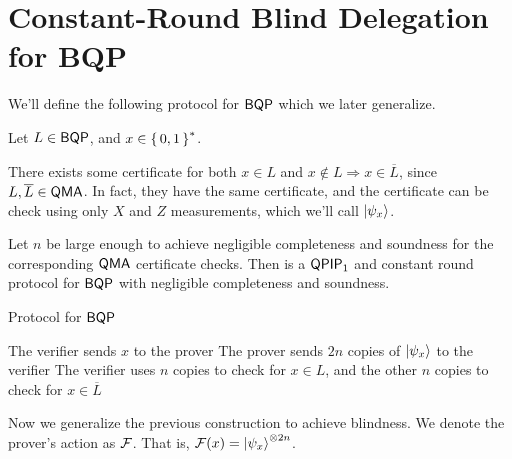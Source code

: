 \section{Constant-Round Blind Delegation for BQP}
\label{sec:BlindBQP}



We'll define the following protocol for $\operatorname{\mathsf{BQP}}$ which we later generalize.

Let $L\in\operatorname{\mathsf{BQP}}$, and $x\in\set{0,1}^*$.

There exists some certificate for both $x\in L$ and $x\notin L\Rightarrow x\in\overline{L}$, since $L, \overline{L}\in\operatorname{\mathsf{QMA}}$.
In fact, they have the same certificate, and the certificate can be check using only $X$ and $Z$ measurements, which we'll call $\ket{\psi_x}$. 

\begin{thm}
	Let $n$ be large enough to achieve negligible completeness and soundness for the corresponding $\operatorname{\mathsf{QMA}}$ certificate checks.
	Then  is a $\operatorname{\mathsf{QPIP}}_1$ and constant round protocol for $\operatorname{\mathsf{BQP}}$ with negligible completeness and soundness.
\end{thm}

\begin{algorithm}
	\caption{Protocol for $\operatorname{\mathsf{BQP}}$}
	\label{proto:BQP}
	\begin{algorithmic}[1]
		\State The verifier sends $x$ to the prover
		\State The prover sends $2n$ copies of $\ket{\psi_x}$ to the verifier
		\State The verifier uses $n$ copies to check for $x\in L$, and the other $n$ copies to check for $x\in\overline{L}$
	\end{algorithmic}
\end{algorithm}

Now we generalize the previous construction to achieve blindness.
We denote the prover's action as $\mathcal{F}$. That is, $\mathcal{F}(x)=\ket{\psi_x}^{\otimes 2n}$.

